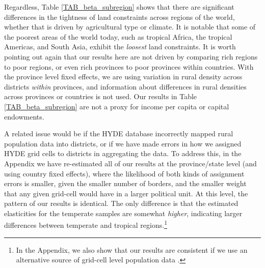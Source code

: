 Regardless, Table \ref{TAB_beta_subregion} shows that there are significant differences in the tightness of land constraints across regions of the world, whether that is driven by agricultural type or climate. It is notable that some of the poorest areas of the world today, such as tropical Africa, the tropical Americas, and South Asia, exhibit the \textit{loosest} land constraints. It is worth pointing out again that our results here are not driven by comparing rich regions to poor regions, or even rich provinces to poor provinces within countries. With the province level fixed effects, we are using variation in rural density across districts \textit{within} provinces, and information about differences in rural densities across provinces or countries is not used. Our results in Table \ref{TAB_beta_subregion} are not a proxy for income per capita or capital endowments.




A related issue would be if the HYDE database incorrectly mapped rural population data into districts, or if we have made errors in how we assigned HYDE grid cells to districts in aggregating the data. To address this, in the Appendix we have re-estimated all of our results at the province/state level (and using country fixed effects), where the likelihood of both kinds of assignment errors is smaller, given the smaller number of borders, and the smaller weight that any given grid-cell would have in a larger political unit. At this level, the pattern of our results is identical. The only difference is that the estimated elasticities for the temperate samples are somewhat \textit{higher}, indicating larger differences between temperate and tropical regions.\footnote{In the Appendix, we also show that our results are consistent if we use an alternative source of grid-cell level population data \citep{grump2011}.}

